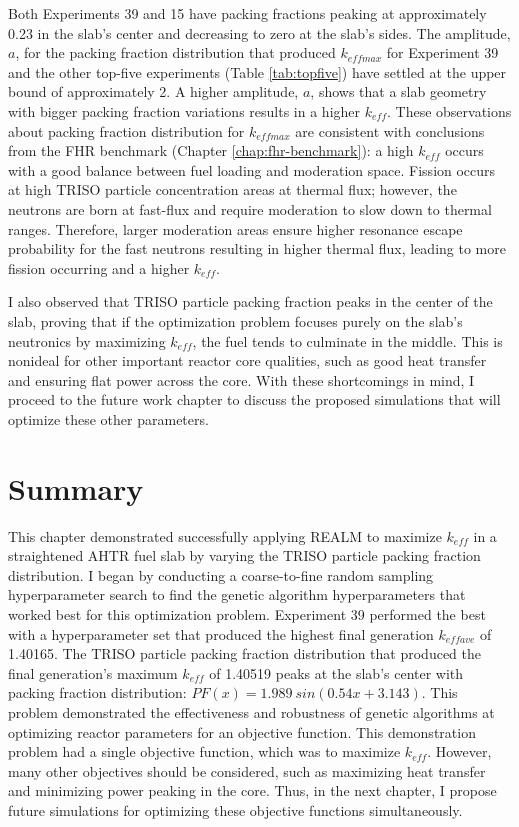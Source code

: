 Both Experiments 39 and 15 have packing fractions peaking at approximately 
0.23 in the slab's center and decreasing to zero at the slab's sides.  
The amplitude, $a$, for the packing fraction distribution that produced $k_{eff max}$ 
for Experiment 39 and the other top-five experiments (Table \ref{tab:topfive}) 
have settled at the upper bound of approximately 2. 
A higher amplitude, $a$, shows that a slab geometry with bigger packing fraction 
variations results in a higher $k_{eff}$. 
These observations about packing fraction distribution for $k_{eff max}$ are 
consistent with conclusions from the \gls{FHR} benchmark (Chapter 
\ref{chap:fhr-benchmark}): a high $k_{eff}$ occurs with a good balance between 
fuel loading and moderation space. 
Fission occurs at high \gls{TRISO} particle concentration areas at thermal flux;
however, the neutrons are born at fast-flux and require moderation to slow down 
to thermal ranges.
Therefore, larger moderation areas ensure higher resonance escape probability for 
the fast neutrons resulting in higher thermal flux, leading to more 
fission occurring and a higher $k_{eff}$. 

I also observed that \gls{TRISO} particle packing fraction peaks in the center 
of the slab, proving that if the optimization problem focuses purely on the slab's neutronics 
by maximizing $k_{eff}$, the fuel tends to culminate in the middle. 
This is nonideal for other important reactor core qualities, such as 
good heat transfer and ensuring flat power across the core. 
With these shortcomings in mind, I proceed to the future work chapter to discuss 
the proposed simulations that will optimize these other parameters. 

\section{Summary}
This chapter demonstrated successfully applying \gls{REALM} to maximize $k_{eff}$ 
in a straightened \acrfull{AHTR} fuel slab by varying the \gls{TRISO} 
particle packing fraction distribution. 
I began by conducting a coarse-to-fine random sampling hyperparameter search to 
find the genetic algorithm hyperparameters that worked best for this optimization 
problem.
Experiment 39 performed the best with a hyperparameter set that produced the 
highest final generation $k_{eff ave}$ of 1.40165. 
The \gls{TRISO} particle packing fraction distribution that produced the final 
generation's maximum $k_{eff}$ of 1.40519 peaks at the slab's center with 
packing fraction distribution: $PF(x)=1.989\ sin(0.54x+3.143)$. 
This problem demonstrated the effectiveness and robustness of genetic algorithms 
at optimizing reactor parameters for an objective function. 
This demonstration problem had a single objective function, which was to maximize 
$k_{eff}$. 
However, many other objectives should be considered, such as maximizing heat 
transfer and minimizing power peaking in the core.
Thus, in the next chapter, I propose future simulations for optimizing
these objective functions simultaneously.
